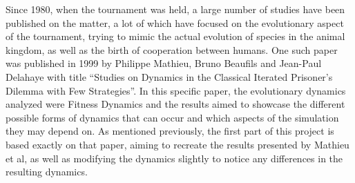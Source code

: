Since 1980, when the tournament was held, a large number of studies have been published on the matter, a lot of which have focused on the evolutionary aspect of the tournament, trying to mimic the actual evolution of species in the animal kingdom, as well as the birth of cooperation between humans. One such paper was published in 1999 by Philippe Mathieu, Bruno Beaufils and Jean-Paul Delahaye with title ``Studies on Dynamics in the Classical Iterated Prisoner's Dilemma with Few Strategies''\cite{mathieu1999}. In this specific paper, the evolutionary dynamics analyzed were Fitness Dynamics and the results aimed to showcase the different possible forms of dynamics that can occur and which aspects of the simulation they may depend on. As mentioned previously, the first part of this project is based exactly on that paper, aiming to recreate the results presented by Mathieu et al, as well as modifying the dynamics slightly to notice any differences in the resulting dynamics.